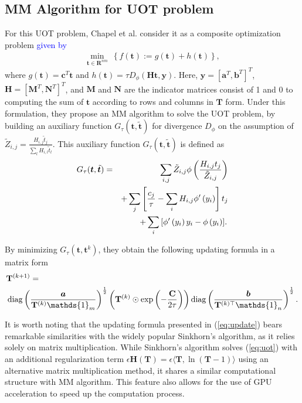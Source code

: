 \documentclass[conference]{IEEEtran}
\newcommand{\one}{\mathds{1}}
\newcommand{\mat}[1]{\mathbf{#1}}
\renewcommand{\vec}[1]{\bm{#1}}
\newcommand{\changeSX}[1]{\textcolor{blue}{#1}}
\begin{document}
\subsection{MM Algorithm for UOT problem}
For this UOT problem, Chapel et al. consider it as a composite optimization problem \cite{Chapel_NeurIPS_2021} \changeSX{given by}
\begin{align}
\label{eq:reg}
\min_{\vec t \in \mat{R}^{nm}} ~ \left\{ f(\vec t) :=  g(\vec t) + h(\vec t)\right\},
\end{align}
where $g(\vec t) = \vec c^{T}\vec t$ and $h(\vec t) = \tau D_{\phi}(\mat H \vec t, \vec y)$. Here, $\vec y = [\vec a^{T}, \vec b^{T}]^{T}$, $\mat H = [\mat {M}^{T}, \mat {N}^{T}]^{T}$, and $\mat {M} $ and $\mat {N}$ are the indicator matrices consist of 1 and 0 to computing the sum of $\vec t$ according to rows and columns in $\mat T$ form. Under this formulation, they propose an MM algorithm to solve the UOT problem, by building an auxiliary function $G_\tau(\boldsymbol{t}, \tilde{\boldsymbol{t}})$ for divergence $D_{\phi}$ on the assumption of $\tilde{Z}_{i, j}=\frac{H_{i, j} \tilde{t}_j}{\sum_l H_{i, l} \tilde{t}_l}$. This auxiliary function $G_\tau(\boldsymbol{t}, \tilde{\boldsymbol{t}})$ is defined as
\begin{eqnarray}
\label{eq:af}
G_\tau(\boldsymbol{t}, \tilde{\boldsymbol{t}})&=&\sum_{i, j} \tilde{Z}_{i, j} \phi\left(\frac{H_{i, j} t_j}{\tilde{Z}_{i, j}}\right)\notag\\
&&+\sum_j\left[\frac{c_j}{\tau}-\sum_i H_{i, j} \phi^{\prime}\left(y_i\right)\right] t_j\notag\\
&&+\sum_i\left[\phi^{\prime}\left(y_i\right) y_i-\phi\left(y_i\right)].\right.
\end{eqnarray}

By minimizing $G_{\tau}( \vec t, \vec t^{k}) $, they obtain the following updating formula in a matrix form
\begin{align}
\label{eq:update}
&\mat{T}^{(k+1)}=\notag\\
&\operatorname{diag}\left(\frac{\vec a}{\mat{T}^{(k)} \one_m}\right)^{\frac{1}{2}}\left(\mat{T}^{(k)} \odot \exp \left(-\frac{\mat C}{2 \tau}\right)\right)
\operatorname{diag}\left(\frac{\vec{b}}{\mat{T}^{(k) \top} \one_n}\right)^{\frac{1}{2}}.\notag\\
\end{align}

It is worth noting that the updating formula presented in (\ref{eq:update}) bears remarkable similarities with the widely popular Sinkhorn's algorithm, as it relies solely on matrix multiplication. While Sinkhorn's algorithm solves (\ref{eq:uot}) with an additional regularization term $\epsilon \mat H(\mat T) = \epsilon \langle \mat T,\ln(\mat T - 1)\rangle$ using an alternative matrix multiplication method, it shares a similar computational structure with MM algorithm. This feature also allows for the use of GPU acceleration to speed up the computation process.
\end{document}
